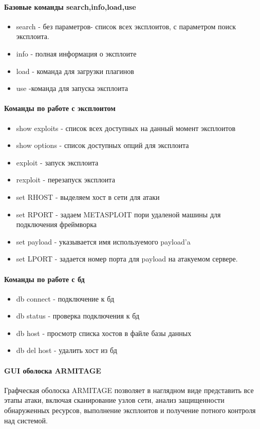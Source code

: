 \documentclass{article}
\begin{document}
 \paragraph{Базовые команды search,info,load,use}
 \begin{itemize}
 	\item search - без параметров- список всех эксплоитов, с параметром поиск эксплоита.
 	\item info - полная информация о эксплоите
 	\item load - команда для загрузки плагинов
 	\item use -команда для запуска эксплоита
 \end{itemize}
 \paragraph{Команды по работе с эксплоитом}
 \begin{itemize}
 	\item show exploits - список всех доступных на данный момент эксплоитов
 	\item show options - список доступных опций для эксплоита
 	\item exploit - запуск эксплоита
 	\item rexploit - перезапуск эксплоита
 	\item set RHOST - выделяем хост в сети для атаки
 	\item set RPORT - задаем METASPLOIT пори удаленой машины для подключения фреймворка
 	\item set payload - указывается имя используемого payload'a
 	\item set LPORT - задается номер порта для payload на атакуемом сервере.
 \end{itemize}
 \paragraph{Команды по работе с бд}
 \begin{itemize}
 	\item db connect - подключение к бд
 	\item db status - проверка подключения к бд
 	\item db host - просмотр списка хостов в файле базы данных
 	\item db del host - удалить хост из бд
 \end{itemize}
 \paragraph{GUI оболоска ARMITAGE\\}
 Графческая оболоска ARMITAGE позволяет в наглядном виде представить все этапы атаки, включая сканирование узлов сети, анализ защищенности обнаруженных ресурсов, выполнение эксплоитов и получение потного контроля над системой. 
\end{document}
